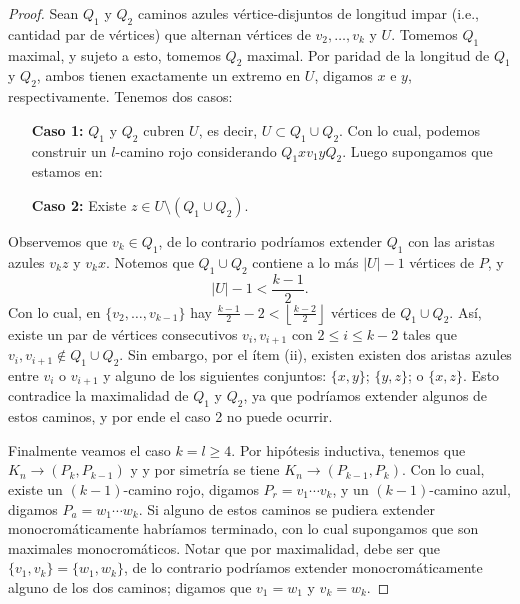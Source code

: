 \documentclass[12pt]{report}
\theoremstyle{plain}
\theoremstyle{definition}
\newcommand{\abs}[1]{\left \vert #1 \right \vert}
\newcommand{\floor}[1]{\left\lfloor #1  \right\rfloor}
\begin{document}
\begin{proof}
Sean $Q_1$ y $Q_2$ caminos azules vértice-disjuntos de longitud impar (i.e., cantidad par de vértices) que alternan vértices de $v_2, \ldots, v_k$ y $U$. Tomemos $Q_1$ maximal, y sujeto a esto, tomemos $Q_2$ maximal. Por paridad de la longitud de $Q_1$ y $Q_2$, ambos tienen exactamente un extremo en $U$, digamos $x$ e $y$, respectivamente. Tenemos dos casos:
\begin{enumerate}
\item[\textbf{Caso 1:}] $Q_1$ y $Q_2$ cubren $U$, es decir, $U \subset Q_1 \cup Q_2$. Con lo cual, podemos construir un $l$-camino rojo considerando $Q_1 x v_1 y Q_2$. Luego supongamos que estamos en:
\item[\textbf{Caso 2:}] Existe $z \in U \setminus ( Q_1 \cup Q_2)$.
\end{enumerate}

Observemos que $v_k \in Q_1$, de lo contrario podríamos extender $Q_1$ con las aristas azules $v_k z$ y $v_k x$. Notemos que $Q_1 \cup Q_2$ contiene a lo más $\abs{U} -1$ vértices de $P$, y
\[
    \abs U  - 1 < \frac{k-1}{2}.
\]
Con lo cual, en $\{v_2, \ldots, v_{k-1}\}$ hay $\frac{k-1}{2} - 2 < \floor{\frac{k-2}{2}}$ vértices de $Q_1 \cup Q_2$. Así, existe un par de vértices consecutivos $v_{i}, v_{i+1}$ con $2 \leq i \leq k-2$ tales que $v_i , v_{i+1} \not \in Q_1 \cup Q_2$. Sin embargo, por el ítem (ii), existen existen dos aristas azules entre $v_i$ o $v_{i+1}$ y alguno de los siguientes conjuntos: $\{x,y\}$; $\{y,z\}$; o $\{x,z\}$. Esto contradice la maximalidad de $Q_1$ y $Q_2$, ya que podríamos extender algunos de estos caminos, y por ende el caso 2 no puede ocurrir.

\bigskip


Finalmente veamos el caso $k = l \geq 4$. Por hipótesis inductiva, tenemos que $K_n \longrightarrow (P_k, P_{k-1})$ y y por simetría se tiene $K_n \longrightarrow (P_{k-1}, P_k)$. Con lo cual, existe un $(k-1)$-camino rojo, digamos $P_r = v_1 \cdots v_k$, y un $(k-1)$-camino azul, digamos $P_a = w_1 \cdots w_k$. Si alguno de estos caminos se pudiera extender monocromáticamente habríamos terminado, con lo cual supongamos que son maximales monocromáticos. Notar que por maximalidad, debe ser que $\{v_1 , v_k\} = \{w_1, w_k\}$, de lo contrario podríamos extender monocromáticamente alguno de los dos caminos; digamos que $v_1 = w_1$ y $v_k = w_k$.


\end{proof}
\end{document}

